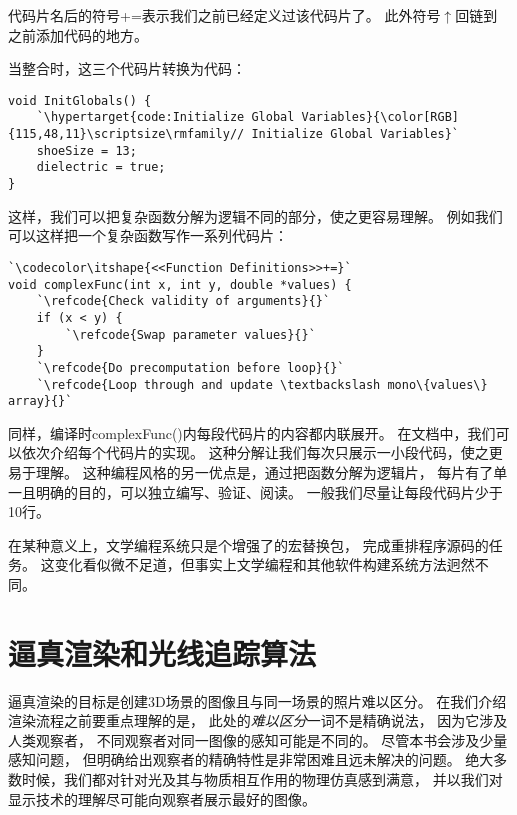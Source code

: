 代码片名后的符号{\codecolor +=}表示我们之前已经定义过该代码片了。
此外符号{\codecolor $\uparrow$}回链到
之前添加代码的地方。

当整合时，这三个代码片转换为代码：
\begin{lstlisting}
void InitGlobals() {
    `\hypertarget{code:Initialize Global Variables}{\color[RGB]{115,48,11}\scriptsize\rmfamily// Initialize Global Variables}`
    shoeSize = 13;
    dielectric = true;
}
\end{lstlisting}

这样，我们可以把复杂函数分解为逻辑不同的部分，使之更容易理解。
例如我们可以这样把一个复杂函数写作一系列代码片：
\begin{lstlisting}
`\codecolor\itshape{<<Function Definitions>>+=}`
void complexFunc(int x, int y, double *values) {
    `\refcode{Check validity of arguments}{}`
    if (x < y) {
        `\refcode{Swap parameter values}{}`
    }
    `\refcode{Do precomputation before loop}{}`
    `\refcode{Loop through and update \textbackslash mono\{values\} array}{}`
\end{lstlisting}

同样，编译时{\ttfamily complexFunc()}内每段代码片的内容都内联展开。
在文档中，我们可以依次介绍每个代码片的实现。
这种分解让我们每次只展示一小段代码，使之更易于理解。
这种编程风格的另一优点是，通过把函数分解为逻辑片，
每片有了单一且明确的目的，可以独立编写、验证、阅读。
一般我们尽量让每段代码片少于10行。

在某种意义上，文学编程系统只是个增强了的宏替换包，
完成重排程序源码的任务。
这变化看似微不足道，但事实上文学编程和其他软件构建系统方法迥然不同。

\section{逼真渲染和光线追踪算法}\label{sec:逼真渲染和光线追踪算法}

逼真渲染的目标是创建3D场景的图像且与同一场景的照片难以区分。
在我们介绍渲染流程之前要重点理解的是，
此处的{\itshape 难以区分}一词不是精确说法，
因为它涉及人类观察者，
不同观察者对同一图像的感知可能是不同的。
尽管本书会涉及少量感知问题，
但明确给出观察者的精确特性是非常困难且远未解决的问题。
绝大多数时候，我们都对针对光及其与物质相互作用的物理仿真感到满意，
并以我们对显示技术的理解尽可能向观察者展示最好的图像。

